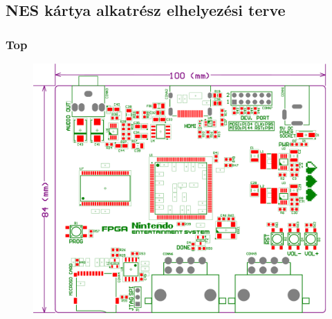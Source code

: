 \appendix
\chapter*{\fuggelek}
\setcounter{chapter}{\appendixnumber}

\section{NES kártya alkatrész elhelyezési terve}
\label{sec:NES-components}
\subsection{Top}
\label{sec:NES-components-top}
\begin{figure}[H]
	\centering
	\includegraphics[width=173mm, keepaspectratio, angle=90]{figures/NES-components-top}
	
\end{figure}


